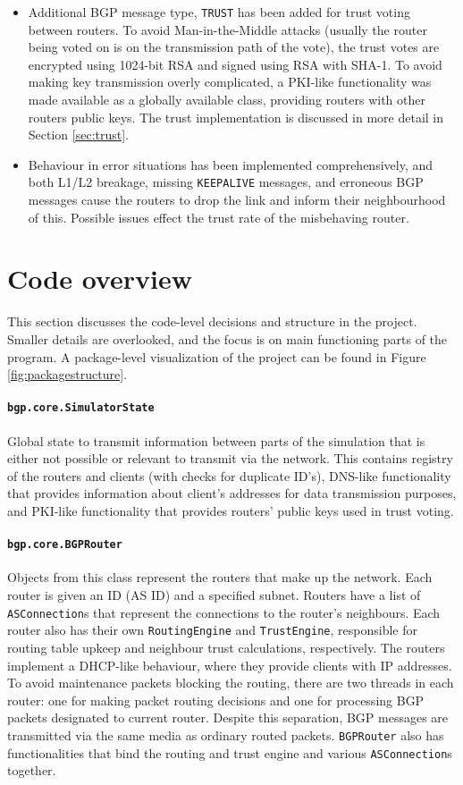 \documentclass[10pt,a4paper,titlepage]{report}
\begin{document}
\begin{itemize}
\item Additional BGP message type, \texttt{TRUST} has been added for trust voting between routers. To avoid Man-in-the-Middle attacks (usually the router being voted on is on the transmission path of the vote), the trust votes are encrypted using 1024-bit RSA and signed using RSA with SHA-1. To avoid making key transmission overly complicated, a PKI-like functionality was made available as a globally available class, providing routers with other routers public keys. The trust implementation is discussed in more detail in Section \ref{sec:trust}.
\item Behaviour in error situations has been implemented comprehensively, and both L1/L2 breakage, missing \texttt{KEEPALIVE} messages, and erroneous BGP messages cause the routers to drop the link and inform their neighbourhood of this. Possible issues effect the trust rate of the misbehaving router.
\end{itemize}

\section{Code overview}\label{sec:hlo}
This section discusses the code-level decisions and structure in the project. Smaller details are overlooked, and the focus is on main functioning parts of the program. A package-level visualization of the project can be found in Figure \ref{fig:packagestructure}.

\paragraph{\texttt{bgp.core.SimulatorState}}
Global state to transmit information between parts of the simulation that is either not possible or relevant to transmit via the network. This contains registry of the routers and clients (with checks for duplicate ID's), DNS-like functionality that provides information about client's addresses for data transmission purposes, and PKI-like functionality that provides routers' public keys used in trust voting.

\paragraph{\texttt{bgp.core.BGPRouter}}
Objects from this class represent the routers that make up the network. Each router is given an ID (AS ID) and a specified subnet. Routers have a list of \texttt{ASConnection}s that represent the connections to the router's neighbours. Each router also has their own \texttt{RoutingEngine} and \texttt{TrustEngine}, responsible for routing table upkeep and neighbour trust calculations, respectively. The routers implement a DHCP-like behaviour, where they provide clients with IP addresses. To avoid maintenance packets blocking the routing, there are two threads in each router: one for making packet routing decisions and one for processing BGP packets designated to current router. Despite this separation, BGP messages are transmitted via the same media as ordinary routed packets. \texttt{BGPRouter} also has functionalities that bind the routing and trust engine and various \texttt{ASConnection}s together.
\end{document}
